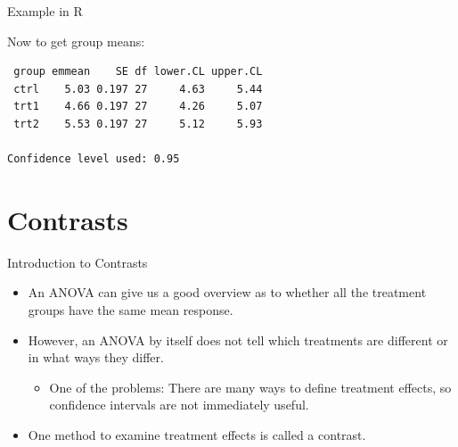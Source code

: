 \begin{frame}{Example in R}
\framebreak

Now to get group means:

\begin{knitrout}\small
{}\color{fgcolor}\begin{kframe}
\begin{alltt}
 \hlkwb{<-}  \hlopt{~} 
\end{alltt}
\begin{verbatim}
 group emmean    SE df lower.CL upper.CL
 ctrl    5.03 0.197 27     4.63     5.44
 trt1    4.66 0.197 27     4.26     5.07
 trt2    5.53 0.197 27     5.12     5.93

Confidence level used: 0.95 
\end{verbatim}
\end{kframe}
\end{knitrout}


\end{frame}

\section{Contrasts}

\begin{frame}[allowframebreaks]{Introduction to Contrasts}
  \begin{itemize}
    \item An ANOVA can give us a good overview as to whether all the treatment groups have the same mean response.
    \item However, an ANOVA by itself does not tell which treatments are different or in what ways they differ.
    \begin{itemize}
      \item One of the problems: There are many ways to define treatment effects, so confidence intervals are not immediately useful.
    \end{itemize}
    \item One method to examine treatment effects is called a \alert{contrast}.
  \end{itemize}
\end{frame}

